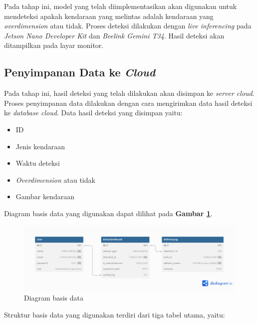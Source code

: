 Pada tahap ini, model yang telah diimplementasikan akan digunakan untuk mendeteksi apakah kendaraan yang melintas adalah kendaraan yang \emph{overdimension} atau tidak. Proses deteksi dilakukan dengan \emph{live inferencing} pada \emph{Jetson Nano Developer Kit} dan \emph{Beelink Gemini T34}. Hasil deteksi akan ditampilkan pada layar monitor.

\subsection{Penyimpanan Data ke \emph{Cloud}}

Pada tahap ini, hasil deteksi yang telah dilakukan akan disimpan ke \emph{server cloud}. Proses penyimpanan data dilakukan dengan cara mengirimkan data hasil deteksi ke \emph{database cloud}. Data hasil deteksi yang disimpan yaitu:

\begin{itemize}[noitemsep,nolistsep]
  \setlength{\itemsep}{5pt}
  \setlength{\parskip}{0pt}
  \setlength{\parsep}{0pt}
  \item ID
  \item Jenis kendaraan
  \item Waktu deteksi
  \item \emph{Overdimension} atau tidak
  \item Gambar kendaraan
\end{itemize}

Diagram basis data yang digunakan dapat dilihat pada \textbf{Gambar \ref{fig:dbdiagram}}.

\begin{figure}[H]
  \centering

  \includegraphics[scale=0.39]{gambar/bab3-basis-data.png}

  \caption{Diagram basis data}
  \label{fig:dbdiagram}
\end{figure}

Struktur basis data yang digunakan terdiri dari tiga tabel utama, yaitu:

